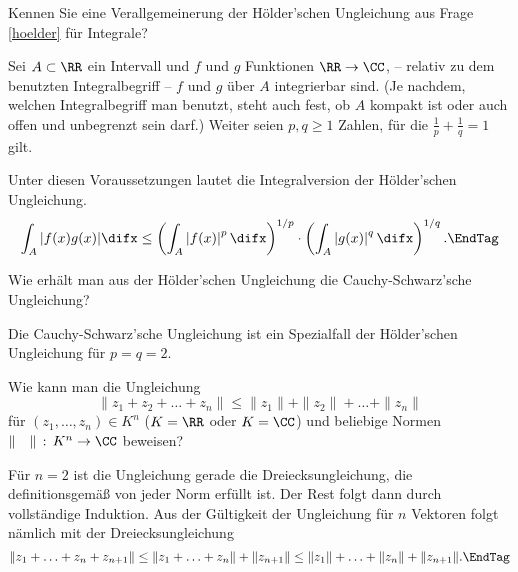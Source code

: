 \begin{frage}\label{01_hldi}
  Kennen Sie eine Verallgemeinerung der Hölder'schen Ungleichung 
  aus Frage \ref{hoelder} für Integrale?
\end{frage}

\begin{antwort}
  Sei $A\subset \RR$ ein Intervall und $f$ und $g$ Funktionen 
  $\RR \to \CC$, {\sd} -- relativ zu dem benutzten Integralbegriff --   
  $f$ und $g$ über $A$ integrierbar sind. (Je nachdem, welchen 
  Integralbegriff man benutzt, steht auch fest, ob $A$ kompakt ist oder 
  auch offen und unbegrenzt sein darf.) Weiter 
  seien $p,q \ge 1$ Zahlen, für die $\frac{1}{p}+\frac{1}{q}=1$ gilt. 

  Unter diesen Voraussetzungen lautet die Integralversion der 
  Hölder'schen Ungleichung. 
  \begin{equation}
    \int_A |f(x)g(x)| \difx \le 
    \left( \int_A \left|f(x)\right|^p \difx \right)^{1/p} \cdot 
    \left( \int_A \left|g(x)\right|^q \difx \right)^{1/q}.
    \EndTag
  \end{equation}
\end{antwort}






\begin{frage}
  Wie erhält man aus der Hölder'schen Ungleichung die Cauchy-Schwarz'sche 
  Ungleichung?
\end{frage}

\begin{antwort}
  Die Cauchy-Schwarz'sche Ungleichung ist ein Spezialfall der Hölder'schen 
  Ungleichung für $p=q=2$.
  \AntEnd
\end{antwort}   


\begin{frage}
  Wie kann man die Ungleichung 
  \[
  \| z_1+z_2+\ldots+z_n\| \le \|z_1\|+\|z_2\|+\ldots + \|z_n\| 
  \]
  für $(z_1, \ldots, z_n) \in K^n$ ($K=\RR$ oder $K=\CC$) und beliebige 
  Normen $\|\quad \|\,:\,K^n \to \CC$ beweisen?
\end{frage}


\begin{antwort}
  Für $n=2$ ist die Ungleichung gerade die Dreiecksungleichung, 
  die definitionsgemäß von jeder Norm erfüllt ist. 
  Der Rest folgt dann durch vollständige 
  Induktion. Aus der Gültigkeit der Ungleichung für $n$ Vektoren 
  folgt nämlich mit der Dreiecksungleichung
  \begin{equation}
    \| z_1+\ldots + z_n + z_{n+1} \| \le 
    \| z_1+\ldots +z_n \|+\| z_{n+1} \| \le 
    \| z_1 \|+\ldots +\|z_{n}\|+\|z_{n+1}\|.
    \EndTag
  \end{equation}
\end{antwort}


